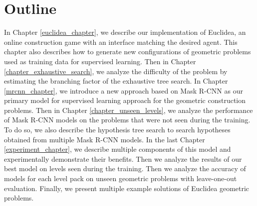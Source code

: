 \section{Outline}
In Chapter \ref{euclidea_chapter}, we describe our implementation of Euclidea, an online construction game with an interface matching the desired agent. This chapter also describes how to generate new configurations of geometric problems used as training data for supervised learning. Then in Chapter \ref{chapter_exhaustive_search}, we analyze the difficulty of the problem by estimating the branching factor of the exhaustive tree search. In Chapter \ref{mrcnn_chapter}, we introduce a new approach based on Mask {R-CNN} as our primary model for supervised learning approach for the geometric construction problems. Then in Chapter \ref{chapter_unseen_levels}, we analyze the performance of Mask {R-CNN} models on the problems that were not seen during the training. To do so, we also describe the hypothesis tree search to search hypotheses obtained from multiple Mask {R-CNN} models. In the last Chapter \ref{experiment_chapter},
we describe multiple components of this model and experimentally demonstrate their benefits. Then we analyze the results of our best model on levels seen during the training. Then we analyze the accuracy of models for each level pack on unseen geometric problems with leave-one-out evaluation. Finally, we present multiple example solutions of Euclidea geometric problems.

